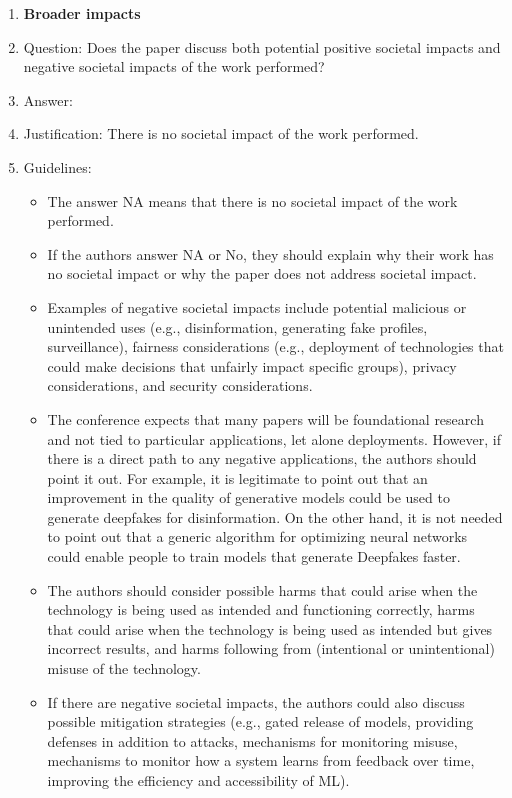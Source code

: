 \documentclass{article}
\numberwithin{equation}{section}
\theoremstyle{definition}
\begin{document}
\begin{enumerate}
\item {\bf Broader impacts}
    \item[] Question: Does the paper discuss both potential positive societal impacts and negative societal impacts of the work performed?
    \item[] Answer: \answerNA{} %
    \item[] Justification: There is no societal impact of the work performed.
    \item[] Guidelines:
    \begin{itemize}
        \item The answer NA means that there is no societal impact of the work performed.
        \item If the authors answer NA or No, they should explain why their work has no societal impact or why the paper does not address societal impact.
        \item Examples of negative societal impacts include potential malicious or unintended uses (e.g., disinformation, generating fake profiles, surveillance), fairness considerations (e.g., deployment of technologies that could make decisions that unfairly impact specific groups), privacy considerations, and security considerations.
        \item The conference expects that many papers will be foundational research and not tied to particular applications, let alone deployments. However, if there is a direct path to any negative applications, the authors should point it out. For example, it is legitimate to point out that an improvement in the quality of generative models could be used to generate deepfakes for disinformation. On the other hand, it is not needed to point out that a generic algorithm for optimizing neural networks could enable people to train models that generate Deepfakes faster.
        \item The authors should consider possible harms that could arise when the technology is being used as intended and functioning correctly, harms that could arise when the technology is being used as intended but gives incorrect results, and harms following from (intentional or unintentional) misuse of the technology.
        \item If there are negative societal impacts, the authors could also discuss possible mitigation strategies (e.g., gated release of models, providing defenses in addition to attacks, mechanisms for monitoring misuse, mechanisms to monitor how a system learns from feedback over time, improving the efficiency and accessibility of ML).
    \end{itemize}
    

\end{enumerate}
\end{document}
